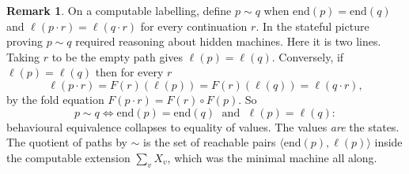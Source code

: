 \documentclass[11pt, a4paper]{article}
\theoremstyle{definition}
\newtheorem{remark}[definition]{Remark}
\theoremstyle{plain}
\begin{document}
\begin{remark}
\label{rem:path-equivalence}
On a computable labelling, define $p \sim q$ when
$\mathrm{end}(p) = \mathrm{end}(q)$ and
$\ell(p \cdot r) = \ell(q \cdot r)$ for every continuation $r$.  In
the stateful picture proving $p \sim q$ required reasoning about
hidden machines.  Here it is two lines.  Taking $r$ to be the empty
path gives $\ell(p) = \ell(q)$.  Conversely, if
$\ell(p) = \ell(q)$ then for every $r$
\[
  \ell(p \cdot r) = F(r)(\ell(p)) = F(r)(\ell(q)) = \ell(q \cdot r),
\]
by the fold equation $F(p \cdot r) = F(r) \circ F(p)$.  So
\[
  p \sim q
  \iff
  \mathrm{end}(p) = \mathrm{end}(q)
  \;\text{ and }\;
  \ell(p) = \ell(q):
\]
behavioural equivalence collapses to equality of values.  The values
\emph{are} the states.  The quotient of paths by $\sim$ is the set of
reachable pairs $\langle \mathrm{end}(p), \ell(p) \rangle$ inside the
computable extension $\sum_{v} X_v$, which was the minimal machine
all along.
\end{remark}
\end{document}
